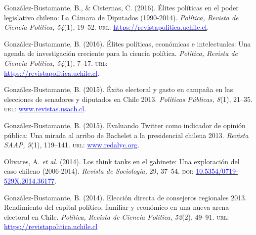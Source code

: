 \begin{publications}
\begin{benumerate}{14}
\item{\small González-Bustamante, B., \& Cisternas, C. (2016). Élites políticas en el poder legislativo chileno: La Cámara de Diputados (1990-2014). {\itshape Política, Revista de Ciencia Política, 54}(1), 19--52. {\scshape url:} \href{https://revistapolitica.uchile.cl/index.php/RP/article/view/42691}{\textcolor{blue}{https://revistapolitica.uchile.cl}}.}\vspace{1mm}

\item{\small González-Bustamante, B. (2016). Élites políticas, económicas e intelectuales: Una agenda de investigación creciente para la ciencia política. {\itshape Política, Revista de Ciencia Política, 54}(1), 7--17. {\scshape url:} \\ \href{https://revistapolitica.uchile.cl/index.php/RP/article/view/42690}{\textcolor{blue}{https://revistapolitica.uchile.cl}}.}\vspace{1mm}

\item{\small González-Bustamante, B. (2015). Éxito electoral y gasto en campaña en las elecciones de senadores y diputados en Chile 2013. {\itshape Políticas Públicas, 8}(1), 21--35. {\scshape url:} \href{http://www.revistas.usach.cl/ojs/index.php/politicas/article/view/2182}{\textcolor{blue}{www.revistas.usach.cl}}.} \vspace{1mm}

\item{\small González-Bustamante, B. (2015). Evaluando Twitter como indicador de opinión pública: Una mirada al arribo de Bachelet a la presidencial chilena 2013. {\itshape Revista SAAP, 9}(1), 119--141. {\scshape url:} \href{https://www.redalyc.org/articulo.oa?id=387142733006}{\textcolor{blue}{www.redalyc.org}}.} \vspace{1mm}

\item{\small Olivares, A. {\itshape et al.} (2014). Los think tanks en el gabinete: Una exploración del caso chileno (2006-2014). {\itshape Revista de Sociología,} 29, 37--54. {\scshape doi}: \href{https://doi.org/10.5354/0719-529X.2014.36177}{\textcolor{blue}{10.5354/0719-529X.2014.36177}}.} \vspace{1mm} %

\item{\small González-Bustamante, B. (2014). Elección directa de consejeros regionales 2013. Rendimiento del capital político, familiar y económico en una nueva arena electoral en Chile. {\itshape Política, Revista de Ciencia Política, 52}(2), 49--91. {\scshape url:} \href{https://revistapolitica.uchile.cl/index.php/RP/article/view/36137}{\textcolor{blue}{https://revistapolitica.uchile.cl}}} \vspace{1mm}


\end{benumerate}
\end{publications}

